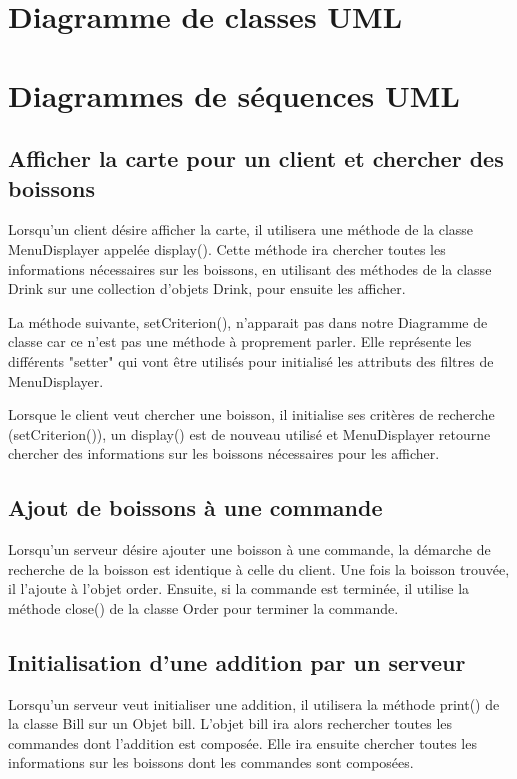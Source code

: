 


\section{Diagramme de classes UML}

\section{Diagrammes de séquences UML}
\subsection{Afficher la carte pour un client et chercher des boissons}
Lorsqu'un client désire afficher la carte, il utilisera une méthode de la classe MenuDisplayer appelée display(). Cette méthode ira chercher toutes les informations nécessaires sur les boissons, en utilisant des méthodes de la classe Drink sur une collection d'objets Drink, pour ensuite les afficher. 

La méthode suivante, setCriterion(), n'apparait pas dans notre Diagramme de classe car ce n'est pas une méthode à proprement parler. Elle représente les différents "setter" qui vont être utilisés pour initialisé les attributs des filtres de MenuDisplayer. 

Lorsque le client veut chercher une boisson, il initialise ses critères de recherche (setCriterion()), un display() est de nouveau utilisé et MenuDisplayer retourne chercher des informations sur les boissons nécessaires pour les afficher. 

\subsection{Ajout de boissons à une commande}

Lorsqu'un serveur désire ajouter une boisson à une commande, la démarche de recherche de la boisson est identique à celle du client. Une fois la boisson trouvée, il l'ajoute à l'objet order. Ensuite, si la commande est terminée, il utilise la méthode close() de la classe Order pour terminer la commande.


\subsection{Initialisation d'une addition par un serveur}
Lorsqu'un serveur veut initialiser une addition, il utilisera la méthode print() de la classe Bill sur un Objet bill. L'objet bill ira alors rechercher toutes les commandes dont l'addition est composée. Elle ira ensuite chercher toutes les informations sur les boissons dont les commandes sont composées.

